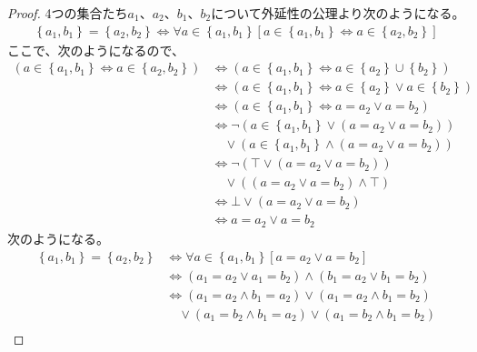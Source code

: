 \documentclass[a4paper]{jsarticle}
\begin{document}
\begin{proof}
4つの集合たち$a_{1}$、$a_{2}$、$b_{1}$、$b_{2}$について外延性の公理より次のようになる。
\begin{align*}
\left\{ a_{1},b_{1} \right\} = \left\{ a_{2},b_{2} \right\} \Leftrightarrow \forall a \in \left\{ a_{1},b_{1} \right\}\left[ a \in \left\{ a_{1},b_{1} \right\} \Leftrightarrow a \in \left\{ a_{2},b_{2} \right\} \right]
\end{align*}
ここで、次のようになるので、
\begin{align*}
\left( a \in \left\{ a_{1},b_{1} \right\} \Leftrightarrow a \in \left\{ a_{2},b_{2} \right\} \right) &\Leftrightarrow \left( a \in \left\{ a_{1},b_{1} \right\} \Leftrightarrow a \in \left\{ a_{2} \right\} \cup \left\{ b_{2} \right\} \right) \\
&\Leftrightarrow \left( a \in \left\{ a_{1},b_{1} \right\} \Leftrightarrow a \in \left\{ a_{2} \right\} \vee a \in \left\{ b_{2} \right\} \right) \\
&\Leftrightarrow \left( a \in \left\{ a_{1},b_{1} \right\} \Leftrightarrow a = a_{2} \vee a = b_{2} \right) \\
&\Leftrightarrow \neg\left( a \in \left\{ a_{1},b_{1} \right\} \vee \left( a = a_{2} \vee a = b_{2} \right) \right) \\
&\quad \vee \left( a \in \left\{ a_{1},b_{1} \right\} \land \left( a = a_{2} \vee a = b_{2} \right) \right) \\
&\Leftrightarrow \neg\left( \top \vee \left( a = a_{2} \vee a = b_{2} \right) \right) \\
&\quad \vee \left( \left( a = a_{2} \vee a = b_{2} \right) \land \top \right) \\
&\Leftrightarrow \bot \vee \left( a = a_{2} \vee a = b_{2} \right) \\
&\Leftrightarrow a = a_{2} \vee a = b_{2}
\end{align*}
次のようになる。
\begin{align*}
\left\{ a_{1},b_{1} \right\} = \left\{ a_{2},b_{2} \right\} &\Leftrightarrow \forall a \in \left\{ a_{1},b_{1} \right\}\left[ a = a_{2} \vee a = b_{2} \right] \\
&\Leftrightarrow \left( a_{1} = a_{2} \vee a_{1} = b_{2} \right) \land \left( b_{1} = a_{2} \vee b_{1} = b_{2} \right) \\
&\Leftrightarrow \left( a_{1} = a_{2} \land b_{1} = a_{2} \right) \vee \left( a_{1} = a_{2} \land b_{1} = b_{2} \right) \\ 
&\quad \vee \left( a_{1} = b_{2} \land b_{1} = a_{2} \right) \vee \left( a_{1} = b_{2} \land b_{1} = b_{2} \right) \\

\end{align*}
\end{proof}
\end{document}
